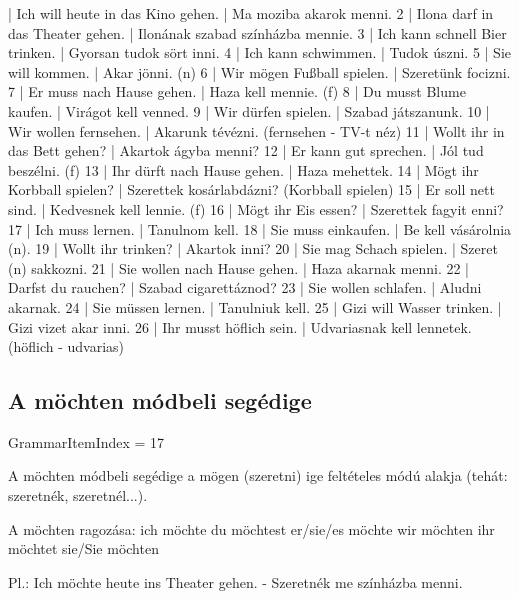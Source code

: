 \documentclass{article}
\newenvironment{desc}{\verbatim}{\endverbatim}
\newenvironment{exmp}{\verbatim}{\endverbatim}
\begin{document}
\begin{exmp}
1 | Ich will heute in das Kino gehen. | Ma moziba akarok menni.
2 | Ilona darf in das Theater gehen. | Ilonának szabad színházba mennie.
3 | Ich kann schnell Bier trinken. | Gyorsan tudok sört inni.
4 | Ich kann schwimmen. | Tudok úszni.
5 | Sie will kommen. | Akar jönni. (n)
6 | Wir mögen Fußball spielen. | Szeretünk focizni.
7 | Er muss nach Hause gehen. | Haza kell mennie. (f)
8 | Du musst Blume kaufen. | Virágot kell venned.
9 | Wir dürfen spielen. | Szabad játszanunk.
10 | Wir wollen fernsehen. | Akarunk tévézni. (fernsehen - TV-t néz)
11 | Wollt ihr in das Bett gehen? | Akartok ágyba menni?
12 | Er kann gut sprechen. | Jól tud beszélni. (f)
13 | Ihr dürft nach Hause gehen. | Haza mehettek.
14 | Mögt ihr Korbball spielen? | Szerettek kosárlabdázni? (Korbball spielen)
15 | Er soll nett sind. | Kedvesnek kell lennie. (f)
16 | Mögt ihr Eis essen? | Szerettek fagyit enni?
17 | Ich muss lernen. | Tanulnom kell.
18 | Sie muss einkaufen. | Be kell vásárolnia (n).
19 | Wollt ihr trinken? | Akartok inni?
20 | Sie mag Schach spielen. | Szeret (n) sakkozni.
21 | Sie wollen nach Hause gehen. | Haza akarnak menni.
22 | Darfst du rauchen? | Szabad cigarettáznod?
23 | Sie wollen schlafen. | Aludni akarnak.
24 | Sie müssen lernen. | Tanulniuk kell.
25 | Gizi will Wasser trinken. | Gizi vizet akar inni.
26 | Ihr musst höflich sein. | Udvariasnak kell lennetek. (höflich - udvarias)
\end{exmp}

\subsection{A möchten módbeli segédige}

GrammarItemIndex = 17

\begin{desc}
A möchten módbeli segédige a mögen (szeretni) ige feltételes módú alakja (tehát: szeretnék, szeretnél...).

A möchten ragozása:
ich möchte
du möchtest
er/sie/es möchte
wir möchten
ihr möchtet
sie/Sie möchten

Pl.: Ich möchte heute ins Theater gehen. - Szeretnék me színházba menni.
\end{desc}
\end{document}
